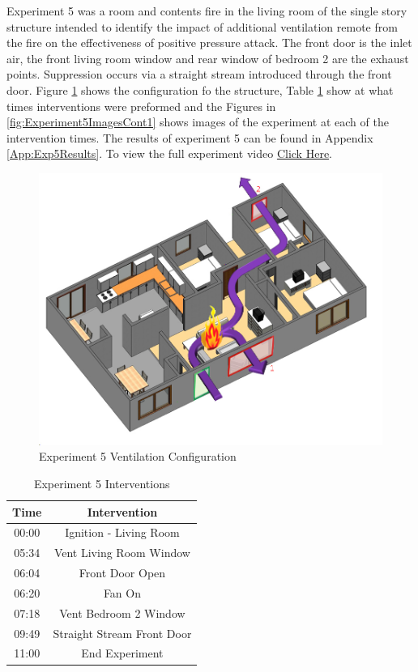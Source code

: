 \documentclass{article}
\begin{document}
Experiment 5 was a room and contents fire in the living room of the single story structure intended to identify the impact of additional ventilation remote from the fire on the effectiveness of positive pressure attack. The front door is the inlet air, the front living room window and rear window of bedroom 2 are the exhaust points. Suppression occurs via a straight stream introduced through the front door. Figure \ref{fig:Exp5VentConfig} shows the configuration fo the structure, Table \ref{Table:Exp5Interventions} show at what times interventions were preformed and the Figures in \ref{fig:Experiment5ImagesCont1} shows images of the experiment at each of the intervention times. The results of experiment 5 can be found in Appendix \ref{App:Exp5Results}. To view the full experiment video \href{https://youtu.be/IezjGcmbLqU}{Click Here}.

\begin{figure}[H]
	\centering
	\includegraphics[width=5in]{0_Images/FireExperiments/Single_Story/Experiment_5.jpg}
	\caption{Experiment 5 Ventilation Configuration}
	\label{fig:Exp5VentConfig}
\end{figure}

\begin{table}[H]
	\centering
	\caption{Experiment 5 Interventions}
	\begin{tabular}{|c|c|} 
		\hline
		Time & Intervention \\ \hline \hline
		00:00 & Ignition - Living Room \\ \hline
		05:34 & Vent Living Room Window \\ \hline
		06:04 & Front Door Open \\ \hline
		06:20 & Fan On \\ \hline
		07:18 & Vent Bedroom 2 Window \\ \hline
		09:49 & Straight Stream Front Door \\ \hline
		11:00 & End Experiment \\ \hline
	\end{tabular}
	\label{Table:Exp5Interventions}
\end{table}
\end{document}
